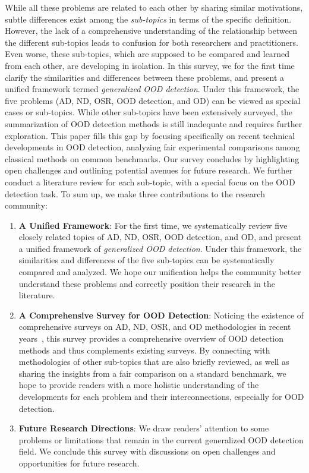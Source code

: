 While all these problems are related to each other by sharing similar motivations, subtle differences exist among the \emph{sub-topics} in terms of the specific definition. 
However, the lack of a comprehensive understanding of the relationship between the different sub-topics leads to confusion for both researchers and practitioners. Even worse, these sub-topics, which are supposed to be compared and learned from each other, are developing in isolation.
In this survey, we for the first time clarify the similarities and differences between these problems, and present a unified framework termed \emph{generalized OOD detection}.
Under this framework, the five problems (\ie AD, ND, OSR, OOD detection, and OD) can be viewed as special cases or sub-topics. 
While other sub-topics have been extensively surveyed, the summarization of OOD detection methods is still inadequate and requires further exploration. This paper fills this gap by focusing specifically on recent technical developments in OOD detection, analyzing fair experimental comparisons among classical methods on common benchmarks. Our survey concludes by highlighting open challenges and outlining potential avenues for future research.
We further conduct a literature review for each sub-topic, with a special focus on the OOD detection task. To sum up, we make three contributions to the research community:
\begin{enumerate}
\item \textbf{A Unified Framework}:
For the first time, we systematically review five closely related topics of AD, ND, OSR, OOD detection, and OD, and present a unified framework of \emph{generalized OOD detection}. Under this framework, the similarities and differences of the five sub-topics can be systematically compared and analyzed. We hope our unification helps the community better understand these problems and correctly position their research in the literature.
\item \textbf{A Comprehensive Survey for OOD Detection}:
Noticing the existence of comprehensive surveys on AD, ND, OSR, and OD methodologies in recent years~, this survey provides a comprehensive overview of OOD detection methods and thus complements existing surveys.
By connecting with methodologies of other sub-topics that are also briefly reviewed, as well as sharing the insights from a fair comparison on a standard benchmark, we hope to provide readers with a more holistic understanding of the developments for each problem and their interconnections, especially for OOD detection.
\item \textbf{Future Research Directions}:
We draw readers' attention to some problems or limitations that remain in the current generalized OOD detection field. We conclude this survey with discussions on open challenges and opportunities for future research.
\end{enumerate}

